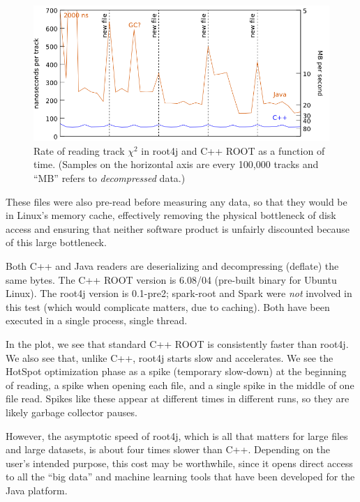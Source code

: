 \documentclass[12pt]{article}
\begin{document}
\begin{figure}[t]
\begin{center}
\includegraphics[width=0.8\linewidth]{root4j_reading_tracks.png}
\end{center}

\caption{\label{root4j_reading_tracks} Rate of reading track $\chi^2$ in root4j and C++ ROOT as a function of time. (Samples on the horizontal axis are every 100,000 tracks and ``MB'' refers to {\it decompressed} data.)}
\end{figure}

These files were also pre-read before measuring any data, so that they would be in Linux's memory cache, effectively removing the physical bottleneck of disk access and ensuring that neither software product is unfairly discounted because of this large bottleneck.

Both C++ and Java readers are deserializing and decompressing (deflate) the same bytes. The C++ ROOT version is 6.08/04 (pre-built binary for Ubuntu Linux). The root4j version is 0.1-pre2; spark-root and Spark were {\it not} involved in this test (which would complicate matters, due to caching). Both have been executed in a single process, single thread.

In the plot, we see that standard C++ ROOT is consistently faster than root4j. We also see that, unlike C++, root4j starts slow and accelerates. We see the HotSpot optimization phase as a spike (temporary slow-down) at the beginning of reading, a spike when opening each file, and a single spike in the middle of one file read. Spikes like these appear at different times in different runs, so they are likely garbage collector pauses.

However, the asymptotic speed of root4j, which is all that matters for large files and large datasets, is about four times slower than C++. Depending on the user's intended purpose, this cost may be worthwhile, since it opens direct access to all the ``big data'' and machine learning tools that have been developed for the Java platform.
\end{document}
